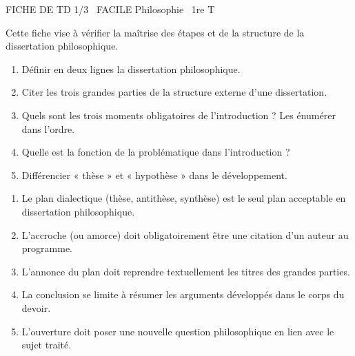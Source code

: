 \documentclass[11pt]{article}
\begin{document}
\begin{tcolorbox}[enhanced,colback=popink,colframe=popink,arc=10pt,boxrule=0pt,left=12pt,right=12pt,top=9pt,bottom=9pt]
{\color{white}\popxbold\small FICHE DE TD 1/3 \textbullet\ FACILE \hfill Philosophie \textbullet\ 1re T\par}
\end{tcolorbox}
\vspace{4pt}
Cette fiche vise à vérifier la maîtrise des étapes et de la structure de la dissertation philosophique.

\begin{exercice}
\begin{enumerate}
    \item Définir en deux lignes la dissertation philosophique.
    \item Citer les trois grandes parties de la structure externe d'une dissertation.
    \item Quels sont les trois moments obligatoires de l'introduction ? Les énumérer dans l'ordre.
    \item Quelle est la fonction de la problématique dans l'introduction ?
    \item Différencier « thèse » et « hypothèse » dans le développement.
\end{enumerate}
\end{exercice}

\begin{exercice}
\begin{enumerate}
    \item Le plan dialectique (thèse, antithèse, synthèse) est le seul plan acceptable en dissertation philosophique.
    \item L'accroche (ou amorce) doit obligatoirement être une citation d'un auteur au programme.
    \item L'annonce du plan doit reprendre textuellement les titres des grandes parties.
    \item La conclusion se limite à résumer les arguments développés dans le corps du devoir.
    \item L'ouverture doit poser une nouvelle question philosophique en lien avec le sujet traité.
\end{enumerate}
\end{exercice}
\end{document}
